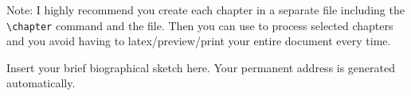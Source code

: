 \documentclass[11pt]{afthesis}
\begin{document}
Note: I highly recommend you create each chapter in a separate file
including the \verb|\chapter| command and \verb|| the file.
Then you can use \verb|| to process selected chapters and
you avoid having to latex/preview/print your entire document every
time.






\begin{vita}
	Insert your brief biographical sketch here. Your permanent
	address is generated automatically.
\end{vita}

\end{document}
